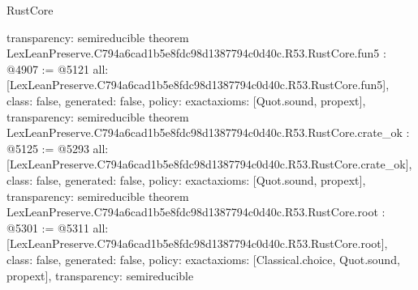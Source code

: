 \begin{lexlean}{RustCore}
\begin{coremodule}
{  transparency: semireducible
}
theorem LexLeanPreserve.C794a6cad1b5e8fdc98d1387794c0d40c.R53.RustCore.fun5 : @4907 := @5121 {
  all: [LexLeanPreserve.C794a6cad1b5e8fdc98d1387794c0d40c.R53.RustCore.fun5],
  class: false,
  generated: false,
  policy: exact{axioms: [Quot.sound, propext]},
  transparency: semireducible
}
theorem LexLeanPreserve.C794a6cad1b5e8fdc98d1387794c0d40c.R53.RustCore.crate_ok : @5125 := @5293 {
  all: [LexLeanPreserve.C794a6cad1b5e8fdc98d1387794c0d40c.R53.RustCore.crate_ok],
  class: false,
  generated: false,
  policy: exact{axioms: [Quot.sound, propext]},
  transparency: semireducible
}
theorem LexLeanPreserve.C794a6cad1b5e8fdc98d1387794c0d40c.R53.RustCore.root : @5301 := @5311 {
  all: [LexLeanPreserve.C794a6cad1b5e8fdc98d1387794c0d40c.R53.RustCore.root],
  class: false,
  generated: false,
  policy: exact{axioms: [Classical.choice, Quot.sound, propext]},
  transparency: semireducible
}


\end{coremodule}
\end{lexlean}
